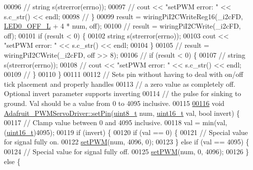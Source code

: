 \begin{DoxyCode}
00096 \textcolor{comment}{//        string s(strerror(errno));}
00097 \textcolor{comment}{//        cout << "setPWM error: " << s.c\_str() << endl;}
00098 \textcolor{comment}{//    \}}
00099     result = wiringPiI2CWriteReg16(\_i2cFD, \hyperlink{Adafruit__PWMServoDriver_8h_a00e3f4b43121817be365b2f22e8bad84}{LED0\_OFF\_L} + 4 * num, off);
00100 \textcolor{comment}{//    result = wiringPiI2CWrite(\_i2cFD, off);}
00101     \textcolor{keywordflow}{if} (result < 0) \{
00102         \textcolor{keywordtype}{string} s(strerror(errno));
00103         cout << \textcolor{stringliteral}{"setPWM error: "} << s.c\_str() << endl;
00104     \}
00105 \textcolor{comment}{//    result = wiringPiI2CWrite(\_i2cFD, off >> 8);}
00106 \textcolor{comment}{//    if (result < 0) \{}
00107 \textcolor{comment}{//        string s(strerror(errno));}
00108 \textcolor{comment}{//        cout << "setPWM error: " << s.c\_str() << endl;}
00109 \textcolor{comment}{//    \}}
00110 \}
00111 
00112 \textcolor{comment}{// Sets pin without having to deal with on/off tick placement and properly handles}
00113 \textcolor{comment}{// a zero value as completely off.  Optional invert parameter supports inverting}
00114 \textcolor{comment}{// the pulse for sinking to ground.  Val should be a value from 0 to 4095 inclusive.}
00115 
\hypertarget{Adafruit__PWMServoDriver_8cpp_source_l00116}{}\hyperlink{classAdafruit__PWMServoDriver_a1246cd50849fe0f068cc5d474e06ae96}{00116} \textcolor{keywordtype}{void} \hyperlink{classAdafruit__PWMServoDriver_a1246cd50849fe0f068cc5d474e06ae96}{Adafruit\_PWMServoDriver::setPin}(\hyperlink{Adafruit__PWMServoDriver_8h_ab077fa1127453be2bd9d4c3c8a768fa7}{uint8\_t} num, 
      \hyperlink{Adafruit__PWMServoDriver_8h_a395b3b2bf5cb4674ab41b6bda68c15bb}{uint16\_t} val, \textcolor{keywordtype}{bool} invert) \{
00117     \textcolor{comment}{// Clamp value between 0 and 4095 inclusive.}
00118     val = min(val, (\hyperlink{Adafruit__PWMServoDriver_8h_a395b3b2bf5cb4674ab41b6bda68c15bb}{uint16\_t})4095);
00119     \textcolor{keywordflow}{if} (invert) \{
00120         \textcolor{keywordflow}{if} (val == 0) \{
00121             \textcolor{comment}{// Special value for signal fully on.}
00122             \hyperlink{classAdafruit__PWMServoDriver_a724a7fc39c6fba34478ecc0eea038bd3}{setPWM}(num, 4096, 0);
00123         \} \textcolor{keywordflow}{else} \textcolor{keywordflow}{if} (val == 4095) \{
00124             \textcolor{comment}{// Special value for signal fully off.}
00125             \hyperlink{classAdafruit__PWMServoDriver_a724a7fc39c6fba34478ecc0eea038bd3}{setPWM}(num, 0, 4096);
00126         \} \textcolor{keywordflow}{else} \{

\end{DoxyCode}
